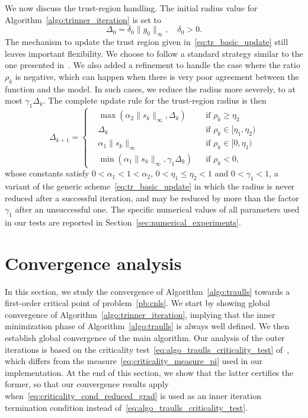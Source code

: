 \documentclass{article}
\numberwithin{equation}{section}
\theoremstyle{plain}
\begin{document}
We now discuss the trust-region handling. The initial radius value for Algorithm~\ref{algo:trinner_iteration} is set to
\begin{equation*}
	\Delta_0 = \delta_0 \| g_0\|_\infty, \quad \delta_0 > 0.
\end{equation*}
The mechanism to update the trust region given in~\eqref{eq:tr_basic_update} still leaves important flexibility. We choose to follow a standard strategy similar to the one presented in~\cite[Chapter~17]{conn-etal:2000}. We also added a refinement to handle the case where the ratio $\rho_k$ is negative, which can happen when there is very poor agreement between the function and the model. In such cases, we reduce the radius more severely, to at most $\gamma_1\Delta_k$. The complete update rule for the trust-region radius is then
\begin{equation*}
	\Delta_{k+1} = \left\{\begin{aligned}
		& \max\left(\alpha_2 \|s_k\|_\infty,\Delta_k\right) & &\text{if } \rho_k \ge \eta_2 \\
		& \Delta_k &  &\text{if } \rho_k \in [\eta_1,\eta_2) \\
		& \alpha_1\|s_k\|_\infty & &\text{if } \rho_k \in [0,\eta_1) \\
		& \min\left(\alpha_1 \|s_k\|_\infty,\gamma_1\Delta_k\right) & &\text{if } \rho_k < 0,
	\end{aligned}\right.
\end{equation*}
whose constants satisfy $0 < \alpha_1 < 1 < \alpha_2$, $0 < \eta_1 \le \eta_2 < 1$ and $0 < \gamma_1 < 1$, a variant of the generic scheme~\eqref{eq:tr_basic_update} in which the radius is never reduced after a successful iteration, and may be reduced by more than the factor $\gamma_1$ after an unsuccessful one. The specific numerical values of all parameters used in our tests are reported in Section~\ref{sec:numerical_experiments}.

	
	\section{Convergence analysis}\label{sec:convergence_analysis}

In this section, we study the convergence of Algorithm~\ref{algo:traulls} towards a first-order critical point of problem~\eqref{pb:cnls}. We start by showing global convergence of Algorithm~\ref{algo:trinner_iteration}, implying that the inner minimization phase of Algorithm~\ref{algo:traulls} is always well defined. We then establish global convergence of the main algorithm. Our analysis of the outer iterations is based on the criticality test~\eqref{eq:algo_traulls_criticality_test} of~\cite{conn-etal:1996b}, which differs from the measure~\eqref{eq:criticality_measure_pi} used in our implementation. At the end of this section, we show that the latter certifies the former, so that our convergence results apply when~\eqref{eq:criticality_cond_reduced_grad} is used as an inner iteration termination condition instead of~\eqref{eq:algo_traulls_criticality_test}.
\end{document}
